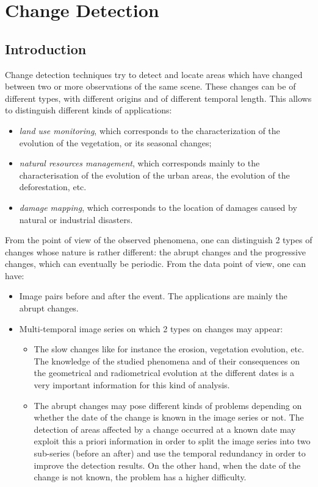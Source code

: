 \chapter{Change Detection}
\section{Introduction}
Change detection techniques try to detect and locate areas which have
changed between two or more observations of the same scene. These
changes can be of different types, with different origins and of
different temporal length. This allows to distinguish different kinds
of applications:
\begin{itemize}
\item \emph{land use monitoring}, which corresponds to the
  characterization of the evolution of the vegetation, or its seasonal
  changes;
\item \emph{natural resources management}, which corresponds mainly
  to the characterisation of the evolution of the urban areas, the
  evolution of the deforestation, etc.
\item \emph{damage mapping}, which corresponds to the location of
  damages caused by natural or industrial disasters.
\end{itemize}

From the point of view of the observed phenomena, one can distinguish
2 types of changes whose nature is rather different: the abrupt
changes and the progressive changes, which can eventually be
periodic. From the data point of view, one can have:

       \begin{itemize}
       \item Image pairs before and after the event. The applications
       are mainly the abrupt changes.

	 \item Multi-temporal image series on which 2 types on changes
	 may appear:
	 \begin{itemize}
	   \item The slow changes like for instance the erosion,
	   vegetation evolution, etc. The knowledge of the studied
	   phenomena and of their consequences on the geometrical
	   and radiometrical evolution at the different dates is a
	   very important information for this kind of analysis.

	     \item The abrupt changes may pose different kinds of
	     problems depending on whether the date of the change is
	     known in the image series or not. The detection of areas
	     affected by a change occurred at a known date may exploit
	     this a priori information in order to split the image
	     series into two sub-series (before an after) and use the
	     temporal redundancy in order to improve the detection
	     results. On the other hand, when the date of the change
	     is not known, the problem has a higher difficulty.

	 \end{itemize}
	 
       \end{itemize}

